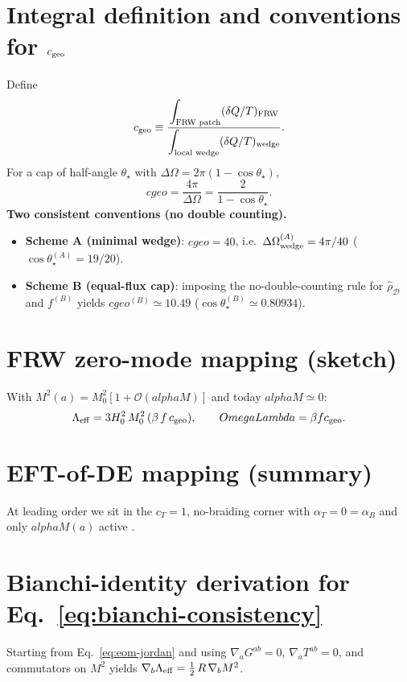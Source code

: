 \documentclass[aps,prd,onecolumn,superscriptaddress,nofootinbib]{revtex4-2}
\def\OmL{OmegaLambda}%
\def\cgeo{cgeo}%
\def\alphaM{alphaM}%
\def\boxed#1{#1}%
\newcommand{\OmL}{\Omega_\Lambda}
\newcommand{\cgeo}{c_{\rm geo}}
\newcommand{\alphaM}{\alpha_M}
\begin{document}
\section{Integral definition and conventions for \texorpdfstring{$c_{\rm geo}$}{cgeo}}
\label{app:cgeo-integral}
Define
\begin{equation}
c_{\rm geo} \equiv \frac{\displaystyle \int_{\text{FRW patch}} (\delta Q/T)_{\text{FRW}}}{\displaystyle \int_{\text{local wedge}} (\delta Q/T)_{\text{wedge}}}.
\label{eq:cgeo-def}
\end{equation}
For a cap of half-angle $\theta_\star$ with $\Delta\Omega=2\pi(1-\cos\theta_\star)$,
\begin{equation}
\cgeo = \frac{4\pi}{\Delta\Omega} = \frac{2}{1-\cos\theta_\star}.
\end{equation}
\textbf{Two consistent conventions (no double counting).}
\begin{itemize}[leftmargin=1.3em]
\item \textbf{Scheme A (minimal wedge)}: $\boxed{\cgeo=40}$, i.e.\ $\Delta\Omega_{\rm wedge}^{(A)}=4\pi/40$ ($\cos\theta_\star^{(A)}=19/20$).
\item \textbf{Scheme B (equal-flux cap)}: imposing the no-double-counting rule for $\hat\rho_{\mathcal D}$ and $f^{(B)}$ yields $\boxed{\cgeo^{(B)} \simeq 10.49}$ ($\cos\theta_\star^{(B)}\simeq 0.80934$).
\end{itemize}

\section{FRW zero-mode mapping (sketch)}
\label{app:frw-mapping}
With $M^2(a)=M_0^2[1+\mathcal O(\alphaM)]$ and today $\alphaM\simeq 0$:
\begin{equation}
\Lambda_{\rm eff} = 3 H_0^2 \,M_0^2 \,(\beta\, f\, c_{\rm geo}),\qquad
\OmL=\beta f c_{\rm geo}.
\end{equation}

\section{EFT-of-DE mapping (summary)}
\label{app:eft}
At leading order we sit in the $c_T=1$, no-braiding corner with $\alpha_T=0=\alpha_B$ and only $\alphaM(a)$ active \cite{BelliniSawicki2014}.

\section{Bianchi-identity derivation for Eq.\ \eqref{eq:bianchi-consistency}}
\label{app:bianchi-derivation}
Starting from Eq.\ \eqref{eq:eom-jordan} and using $\nabla_a G^{ab}=0$, $\nabla_a T^{ab}=0$, and commutators on $M^2$ yields $\nabla_b \Lambda_{\rm eff} = \tfrac12\, R\,\nabla_b M^2$.
\end{document}
